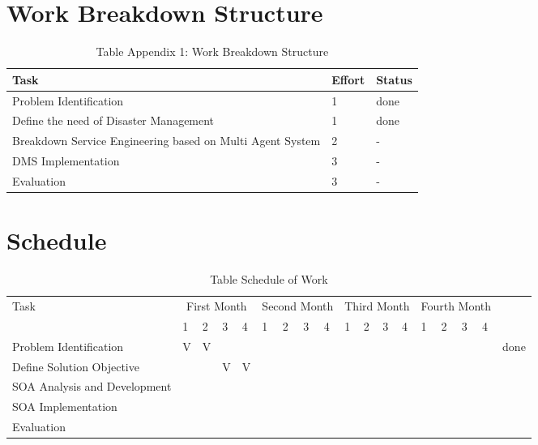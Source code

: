 \section{Work Breakdown Structure}

\begin{table}[h!]
\centering
\caption{Table Appendix 1: Work Breakdown Structure}
\label{tab: app1}
\begin{tabular}[h!]{|p{6cm}|p{2cm}|p{2cm}|}
\hline
Task & Effort & Status \\
\hline
Problem Identification & 1 & done \\
\hline
Define the need of Disaster Management & 1 & done \\
\hline
Breakdown Service Engineering based on Multi Agent System & 2 & - \\
\hline
DMS Implementation & 3 & - \\
\hline
Evaluation & 3 & -\\
\hline 
\end{tabular}
\end{table}

\section{Schedule}
\begin{table}[h!]
\centering
\caption{Table Schedule of Work}
\label{tab: SchWork}
\begin{tabular}[h!]{|p{4cm}|p{0.2cm}|p{0.2cm}|p{0.2cm}|p{0.2cm}|p{0.2cm}|p{0.2cm}|p{0.2cm}|p{0.2cm}|p{0.2cm}|p{0.2cm}|p{0.2cm}|p{0.2cm}|p{0.2cm}|p{0.2cm}|p{0.2cm}|p{0.2cm}|p{1cm}|}
\hline
\multirow {2}{4em}{Task} & \multicolumn{4}{|c|}{First Month} & \multicolumn{4}{|c|}{Second Month} & \multicolumn{4}{|c|}{Third Month} & \multicolumn{4}{|c|}{Fourth Month} & \\
 & 1 & 2 & 3 & 4 & 1 & 2 & 3 & 4 & 1 & 2 & 3 & 4 & 1 & 2 & 3 & 4 &  \\
\hline
Problem Identification & V & V &  &  &  &  &  &  &  &  &  &  &  &  &  &  & done \\
\hline
Define Solution Objective &  &  & V & V &  &  &  &  &  &  &  &  &  &  &  &  &  \\
\hline
SOA Analysis and Development &  &  &  &  &  &  &  &  &  &  &  &  &  &  &  &  &  \\
\hline
SOA Implementation &  &  &  &  &  &  &  &  &  &  &  &  &  &  &  &  &  \\
\hline
Evaluation &  &  &  &  &  &  &  &  &  &  &  &  &  &  &  &  &  \\
\hline
\end{tabular}
\end{table}
